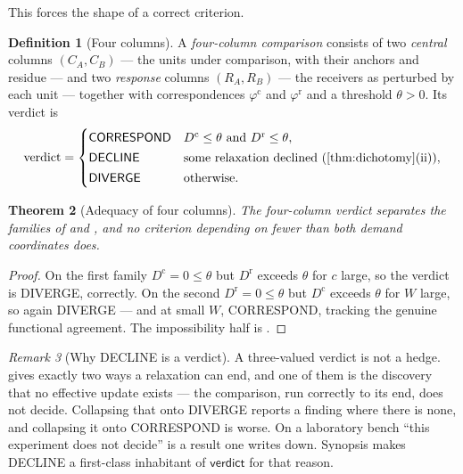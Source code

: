 \documentclass[11pt,twocolumn,a4paper]{article}
\theoremstyle{plain}
\newtheorem{theorem}{Theorem}[section]
\theoremstyle{definition}
\newtheorem{definition}[theorem]{Definition}
\theoremstyle{remark}
\newtheorem{remark}[theorem]{Remark}
\newcommand{\dem}{D}
\newcommand{\corr}{\varphi}
\newcommand{\typ}[1]{\ensuremath{\mathsf{#1}}}
\begin{document}
This forces the shape of a correct criterion.

\begin{definition}[Four columns]
\label{def:fourq}
A \emph{four-column comparison} consists of two \emph{central} columns
$(C_A, C_B)$ --- the units under comparison, with their anchors and
residue --- and two \emph{response} columns $(R_A, R_B)$ --- the
receivers as perturbed by each unit --- together with correspondences
$\corr^{\mathrm{c}}$ and $\corr^{\mathrm{r}}$ and a threshold $\theta>0$.
Its verdict is
\[
\mathrm{verdict}=
\begin{cases}
\textsf{CORRESPOND} & \dem^{\mathrm{c}}\le\theta \text{ and } \dem^{\mathrm{r}}\le\theta,\\[2pt]
\textsf{DECLINE}    & \text{some relaxation declined (\Cref{thm:dichotomy}(ii))},\\[2pt]
\textsf{DIVERGE}    & \text{otherwise.}
\end{cases}
\]
\end{definition}

\begin{theorem}[Adequacy of four columns]
\label{thm:four}
The four-column verdict separates the families of
 and , and no criterion
depending on fewer than both demand coordinates does.
\end{theorem}

\begin{proof}
On the first family $\dem^{\mathrm{c}}=0\le\theta$ but
$\dem^{\mathrm{r}}$ exceeds $\theta$ for $c$ large, so the verdict is
\textsf{DIVERGE}, correctly. On the second $\dem^{\mathrm{r}}=0\le\theta$
but $\dem^{\mathrm{c}}$ exceeds $\theta$ for $W$ large, so again
\textsf{DIVERGE} --- and at small $W$, \textsf{CORRESPOND}, tracking the
genuine functional agreement. The impossibility half is
.
\end{proof}

\begin{remark}[Why \textsf{DECLINE} is a verdict]
\label{rem:decline}
A three-valued verdict is not a hedge.  gives
exactly two ways a relaxation can end, and one of them is the discovery
that no effective update exists --- the comparison, run correctly to its
end, does not decide. Collapsing that onto \textsf{DIVERGE} reports a
finding where there is none, and collapsing it onto \textsf{CORRESPOND}
is worse. On a laboratory bench ``this experiment does not decide'' is a
result one writes down. Synopsis makes \textsf{DECLINE} a first-class
inhabitant of \typ{verdict} for that reason.
\end{remark}
\end{document}
